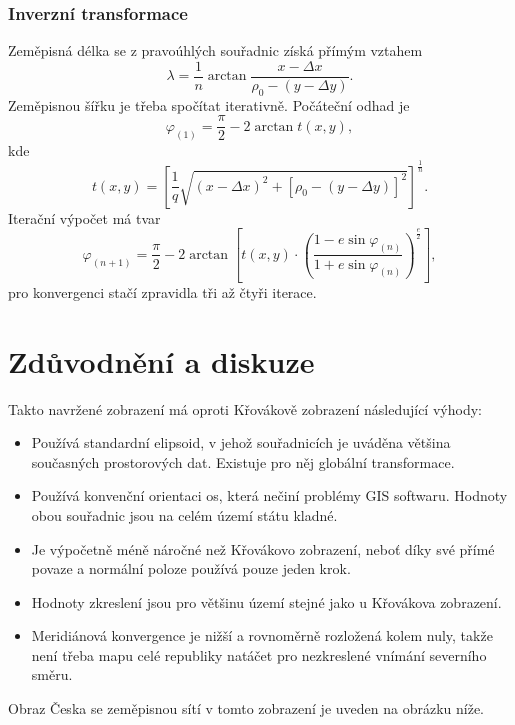 \documentclass[a4paper]{article}
\begin{document}
\subsubsection{Inverzní transformace}
Zeměpisná délka se z pravoúhlých souřadnic získá přímým vztahem
\begin{equation*}
\lambda = \frac{1}{n} \arctan{\frac{x - \Delta x}{\rho_0 - (y - \Delta y)}}.
\end{equation*}
Zeměpisnou šířku je třeba spočítat iterativně. Počáteční odhad je
\begin{equation*}
\varphi_{(1)} = \frac{\pi}{2} - 2 \arctan{t(x,y)},
\end{equation*}
kde
\begin{equation*}
t(x,y) = \left[\frac{1}{q}\sqrt{(x - \Delta x)^2 + [\rho_0 - (y - \Delta y)]^2}\right]^{\frac{1}{n}}.
\end{equation*}
Iterační výpočet má tvar
\begin{equation*}
\varphi_{(n+1)} = \frac{\pi}{2} - 2 \arctan{\left[t(x,y) \cdot \left(\frac{1-e\sin{\varphi_{(n)}}}{1+e\sin{\varphi_{(n)}}}\right)^{\frac{e}{2}}\right]},
\end{equation*}
pro konvergenci stačí zpravidla tři až čtyři iterace.

\section{Zdůvodnění a diskuze}
Takto navržené zobrazení má oproti Křovákově zobrazení následující výhody:
\begin{itemize}
  \item Používá standardní elipsoid, v jehož souřadnicích je uváděna většina současných prostorových dat. Existuje pro něj globální transformace.
  \item Používá konvenční orientaci os, která nečiní problémy GIS softwaru. Hodnoty obou souřadnic jsou na celém území státu kladné.
  \item Je výpočetně méně náročné než Křovákovo zobrazení, neboť díky své přímé povaze a normální poloze používá pouze jeden krok.
  \item Hodnoty zkreslení jsou pro většinu území stejné jako u Křovákova zobrazení.
  \item Meridiánová konvergence je nižší a rovnoměrně rozložená kolem nuly, takže není třeba mapu celé republiky natáčet pro nezkreslené vnímání severního směru.
\end{itemize}
Obraz Česka se zeměpisnou sítí v tomto zobrazení je uveden na obrázku níže.

\end{document}
